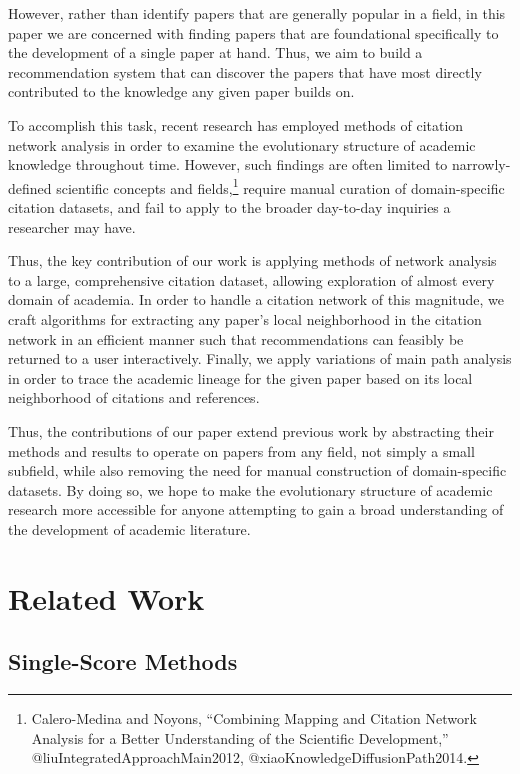 \documentclass[lettepaper,]{article}
\begin{document}
However, rather than identify papers that are generally popular in a
field, in this paper we are concerned with finding papers that are
foundational specifically to the development of a single paper at hand.
Thus, we aim to build a recommendation system that can discover the
papers that have most directly contributed to the knowledge any given
paper builds on.

To accomplish this task, recent research has employed methods of
citation network analysis in order to examine the evolutionary structure
of academic knowledge throughout time. However, such findings are often
limited to narrowly-defined scientific concepts and fields,\footnote{Calero-Medina
  and Noyons, ``Combining Mapping and Citation Network Analysis for a
  Better Understanding of the Scientific Development,''
  @liuIntegratedApproachMain2012, @xiaoKnowledgeDiffusionPath2014.}
require manual curation of domain-specific citation datasets, and fail
to apply to the broader day-to-day inquiries a researcher may have.

Thus, the key contribution of our work is applying methods of network
analysis to a large, comprehensive citation dataset, allowing
exploration of almost every domain of academia. In order to handle a
citation network of this magnitude, we craft algorithms for extracting
any paper's local neighborhood in the citation network in an efficient
manner such that recommendations can feasibly be returned to a user
interactively. Finally, we apply variations of main path analysis in
order to trace the academic lineage for the given paper based on its
local neighborhood of citations and references.

Thus, the contributions of our paper extend previous work by abstracting
their methods and results to operate on papers from any field, not
simply a small subfield, while also removing the need for manual
construction of domain-specific datasets. By doing so, we hope to make
the evolutionary structure of academic research more accessible for
anyone attempting to gain a broad understanding of the development of
academic literature.

\hypertarget{related-work}{%
\section{Related Work}\label{related-work}}

\hypertarget{single-score-methods}{%
\subsection{Single-Score Methods}\label{single-score-methods}}
\end{document}
